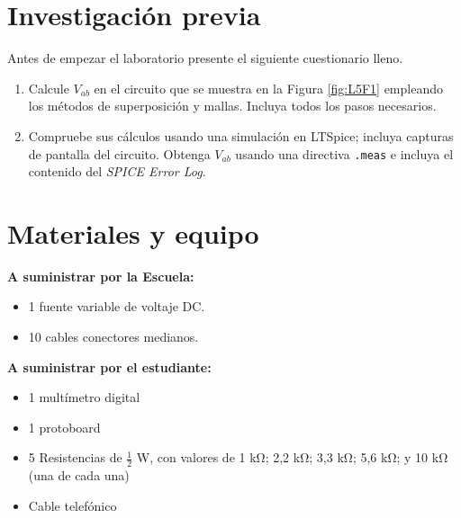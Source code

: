 \documentclass[12pt,letterpaper]{report}
\newcommand{\inv}{Investigación previa}
\newcommand{\mat}{Materiales y equipo}
\newcommand{\antesde}{Antes de empezar el laboratorio presente el siguiente cuestionario lleno.}
\begin{document}
\section{\inv}
\antesde
\begin{enumerate}
\item Calcule $V_{ab}$ en el circuito que se muestra en la Figura \ref{fig:L5F1} empleando los métodos de superposición y mallas. Incluya todos los pasos necesarios.
\item Compruebe sus cálculos usando una simulación en LTSpice; incluya capturas de pantalla del circuito. Obtenga $V_{ab}$ usando una directiva \verb!.meas! e incluya el contenido del \emph{SPICE Error Log}. 
\end{enumerate}

\section{\mat}
\textbf{A suministrar por la Escuela:}
\begin{itemize}
\item 1 fuente variable de voltaje DC.
\item 10 cables conectores medianos.
\end{itemize}
\textbf{A suministrar por el estudiante:}
\begin{itemize} 
\item 1 multímetro digital
\item 1 protoboard
\item 5 Resistencias de $\frac{1}{2}$ \si{\watt}, con valores de 1 \si{\kilo\ohm}; 2,2 \si{\kilo\ohm}; 3,3 \si{\kilo\ohm}; 5,6 \si{\kilo\ohm}; y 10 \si{\kilo\ohm} (una de cada una)
\item Cable telefónico
\end{itemize}
\end{document}

